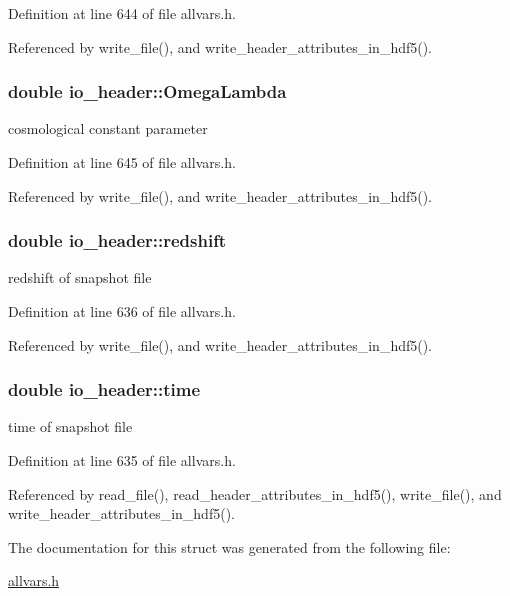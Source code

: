Definition at line 644 of file allvars.h.



Referenced by write\_\-file(), and write\_\-header\_\-attributes\_\-in\_\-hdf5().

\hypertarget{structio__header_aa2cdc9653addc264b58134006bca1bb8}{
\subsubsection[{OmegaLambda}]{\setlength{\rightskip}{0pt plus 5cm}double {\bf io\_\-header::OmegaLambda}}}
\label{structio__header_aa2cdc9653addc264b58134006bca1bb8}
cosmological constant parameter 

Definition at line 645 of file allvars.h.



Referenced by write\_\-file(), and write\_\-header\_\-attributes\_\-in\_\-hdf5().

\hypertarget{structio__header_ae2484703f374288fb266ff268a1ffa91}{
\subsubsection[{redshift}]{\setlength{\rightskip}{0pt plus 5cm}double {\bf io\_\-header::redshift}}}
\label{structio__header_ae2484703f374288fb266ff268a1ffa91}
redshift of snapshot file 

Definition at line 636 of file allvars.h.



Referenced by write\_\-file(), and write\_\-header\_\-attributes\_\-in\_\-hdf5().

\hypertarget{structio__header_ad6237959a3590772366f18000a47a7d6}{
\subsubsection[{time}]{\setlength{\rightskip}{0pt plus 5cm}double {\bf io\_\-header::time}}}
\label{structio__header_ad6237959a3590772366f18000a47a7d6}
time of snapshot file 

Definition at line 635 of file allvars.h.



Referenced by read\_\-file(), read\_\-header\_\-attributes\_\-in\_\-hdf5(), write\_\-file(), and write\_\-header\_\-attributes\_\-in\_\-hdf5().



The documentation for this struct was generated from the following file:\begin{DoxyCompactItemize}
\item 
\hyperlink{allvars_8h}{allvars.h}\end{DoxyCompactItemize}
